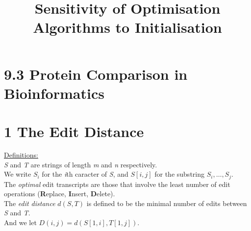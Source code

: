 \documentclass[10pt]{article}
\title{\flushleft2.4 Sensitivity of Optimisation Algorithms to Initialisation\\ }
\date{}
\begin{document}
\hfill{}
\section*{\LARGE{9.3 Protein Comparison in Bioinformatics}}
\section*{1 The Edit Distance}
\underline{Definitions:}\\
\textit{S} and \textit{T} are strings of length \textit{m} and \textit{n} respectively.\\
We write $S_i$ for the \textit{i}th caracter of \textit{S}, and $S[i,j]$ for the substring $S_i,\dots,S_j$.\\
The \textit{optimal} edit transcripts are those that involve the least number of edit operations (\textbf{R}eplace, \textbf{I}nsert, \textbf{D}elete).\\
The \textit{edit distance} $d(S,T)$ is defined to be the minimal number of edits between \textit{S} and \textit{T}.\\
And we let $D(i,j)=d(S[1,i],T[1,j])$.
\end{document}
